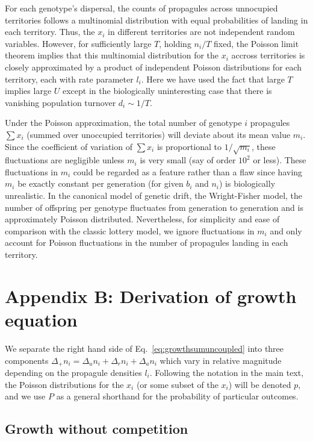 \documentclass[11pt]{article}
\begin{document}
For each genotype's dispersal, the counts of propagules across unnocupied territories follows a multinomial distribution with equal probabilities of landing in each territory. Thus, the $x_i$ in different territories are not independent random variables. However, for sufficiently large $T$, holding $n_i/T$ fixed, the Poisson limit theorem implies that this multinomial distribution for the $x_i$ accross territories is closely approximated by a product of independent Poisson distributions for each territory, each with rate parameter $l_i$. Here we have used the fact that large $T$ implies large $U$ except in the biologically uninteresting case that there is vanishing population turnover $d_i \sim 1/T$. 

Under the Poisson approximation, the total number of genotype $i$ propagules $\sum x_i$ (summed over unoccupied territories) will deviate about its mean value $m_i$. Since the coefficient of variation of $\sum x_i$ is proportional to $1/\sqrt{m_i}$, these fluctuations are negligible unless $m_i$ is very small (say of order $10^2$ or less). These fluctuations in $m_i$ could be regarded as a feature rather than a flaw since having $m_i$ be exactly constant per generation (for given $b_i$ and $n_i$) is biologically unrealistic. In the canonical model of genetic drift, the Wright-Fisher model, the number of offspring per genotype fluctuates from generation to generation and is approximately Poisson distributed. Nevertheless, for simplicity and ease of comparison with the classic lottery model, we ignore fluctuations in $m_i$ and only account for Poisson fluctuations in the number of propagules landing in each territory. 

\section*{Appendix B: Derivation of growth equation}

We separate the right hand side of Eq.~\eqref{eq:growthsumuncoupled} into three components $\Delta_+ n_i = \Delta_u n_i+\Delta_r n_i+\Delta_a n_i$ which vary in relative magnitude depending on the propagule densities $l_i$. Following the notation in the main text, the Poisson distributions for the $x_i$ (or some subset of the $x_i$) will be denoted $p$, and we use $P$ as a general shorthand for the probability of particular outcomes.

\subsection*{Growth without competition}
\end{document}

